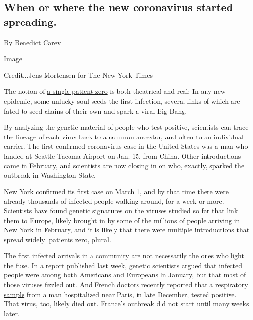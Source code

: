 \hypertarget{when-or-where-the-new-coronavirus-started-spreading}{%
\subsection{When or where the new coronavirus started
spreading.}\label{when-or-where-the-new-coronavirus-started-spreading}}

By Benedict Carey

Image

Credit...Jens Mortensen for The New York Times

The notion of
\href{https://www.nytimes3xbfgragh.onion/2016/10/27/health/hiv-patient-zero-genetic-analysis.html}{a
single patient zero} is both theatrical and real: In any new epidemic,
some unlucky soul seeds the first infection, several links of which are
fated to seed chains of their own and spark a viral Big Bang.

By analyzing the genetic material of people who test positive,
scientists can trace the lineage of each virus back to a common
ancestor, and often to an individual carrier. The first confirmed
coronavirus case in the United States was a man who landed at
Seattle-Tacoma Airport on Jan. 15, from China. Other introductions came
in February, and scientists are now closing in on who, exactly, sparked
the outbreak in Washington State.

New York confirmed its first case on March 1, and by that time there
were already thousands of infected people walking around, for a week or
more. Scientists have found genetic signatures on the viruses studied so
far that link them to Europe, likely brought in by some of the millions
of people arriving in New York in February, and it is likely that there
were multiple introductions that spread widely: patients zero, plural.

The first infected arrivals in a community are not necessarily the ones
who light the fuse.
\href{https://www.biorxiv.org/content/10.1101/2020.05.21.109322v1.full.pdf}{In
a report published last week}, genetic scientists argued that infected
people were among both Americans and Europeans in January, but that most
of those viruses fizzled out. And French doctors
\href{https://www.sciencedirect.com/science/article/pii/S0924857920301643}{recently
reported that a respiratory sample} from a man hospitalized near Paris,
in late December, tested positive. That virus, too, likely died out.
France's outbreak did not start until many weeks later.

